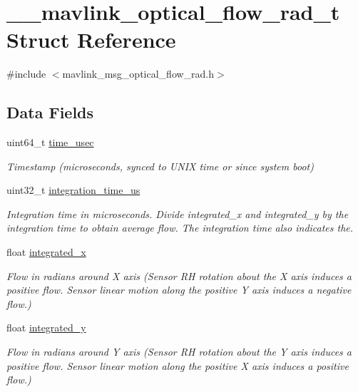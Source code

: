\hypertarget{struct____mavlink__optical__flow__rad__t}{\section{\+\_\+\+\_\+mavlink\+\_\+optical\+\_\+flow\+\_\+rad\+\_\+t Struct Reference}
\label{struct____mavlink__optical__flow__rad__t}
}


{\ttfamily \#include $<$mavlink\+\_\+msg\+\_\+optical\+\_\+flow\+\_\+rad.\+h$>$}

\subsection*{Data Fields}
\begin{DoxyCompactItemize}
\item 
uint64\+\_\+t \hyperlink{struct____mavlink__optical__flow__rad__t_ae6daf47eecbfcaae33d28058f9f66343}{time\+\_\+usec}
\begin{DoxyCompactList}\small\item\em Timestamp (microseconds, synced to U\+N\+I\+X time or since system boot) \end{DoxyCompactList}\item 
uint32\+\_\+t \hyperlink{struct____mavlink__optical__flow__rad__t_a71280c6e42fe0c2a7590b8ac54275070}{integration\+\_\+time\+\_\+us}
\begin{DoxyCompactList}\small\item\em Integration time in microseconds. Divide integrated\+\_\+x and integrated\+\_\+y by the integration time to obtain average flow. The integration time also indicates the. \end{DoxyCompactList}\item 
float \hyperlink{struct____mavlink__optical__flow__rad__t_a1253563da9b3db2235f33a6aae3d9427}{integrated\+\_\+x}
\begin{DoxyCompactList}\small\item\em Flow in radians around X axis (Sensor R\+H rotation about the X axis induces a positive flow. Sensor linear motion along the positive Y axis induces a negative flow.) \end{DoxyCompactList}\item 
float \hyperlink{struct____mavlink__optical__flow__rad__t_acc14c952d5780461cf91a5d4a7fedc89}{integrated\+\_\+y}
\begin{DoxyCompactList}\small\item\em Flow in radians around Y axis (Sensor R\+H rotation about the Y axis induces a positive flow. Sensor linear motion along the positive X axis induces a positive flow.) \end{DoxyCompactList}\item 

\end{DoxyCompactItemize}

